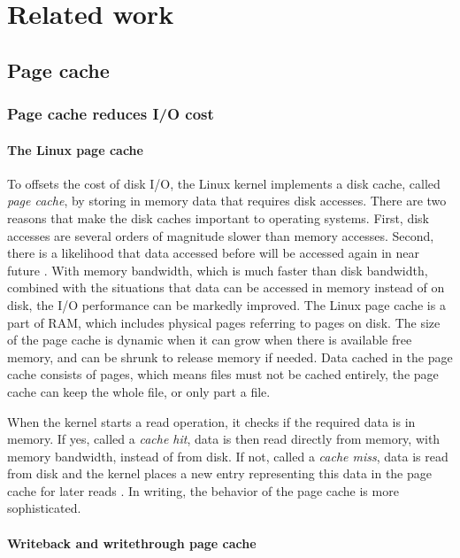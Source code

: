 \chapter{Related work}
\label{relatedwork}

\section{Page cache}

\subsection{Page cache reduces I/O cost}

\subsubsection{The Linux page cache}

To offsets the cost of disk I/O, the Linux kernel implements a disk cache, 
called \textit{page cache}, by storing in memory data that requires 
disk accesses. 
There are two reasons that make the disk caches important to 
operating systems. 
First, disk accesses are several orders of magnitude slower than 
memory accesses. 
Second, there is a likelihood that data accessed before will be accessed 
again in near future \cite{linuxdev3rd2010}. 
With memory bandwidth, which is much faster than disk bandwidth, 
combined with the situations that data can be accessed in memory instead 
of on disk, the I/O performance can be markedly improved. 
The Linux page cache is a part of RAM, which includes physical pages 
referring to pages on disk. 
The size of the page cache is dynamic when it can grow when there is 
available free memory, and can be shrunk to release memory if needed. 
Data cached in the page cache consists of pages, which means files must 
not be cached entirely, the page cache can keep the whole file, 
or only part a file. 

When the kernel starts a read operation, it checks if the required data is 
in memory. If yes, called a \textit{cache hit}, data is then read directly 
from memory, with memory bandwidth, instead of from disk. 
If not, called a \textit{cache miss}, data is read from disk and the kernel 
places a new entry representing this data in the page cache for later reads 
\cite{linuxdev3rd2010}. 
In writing, the behavior of the page cache is more sophisticated.

\subsubsection{Writeback and writethrough page cache}

